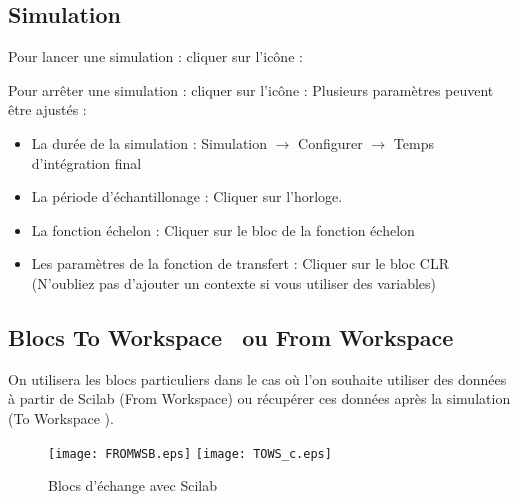 \subsection{Simulation}
Pour lancer une simulation : cliquer sur l'icône : 

Pour arrêter une simulation : cliquer sur l'icône : 
Plusieurs paramètres peuvent être ajustés :
\begin{itemize}
    \item La durée de la simulation : Simulation $\rightarrow$ 
          Configurer $\rightarrow$ Temps d'intégration final
    \item La période d'échantillonage : Cliquer sur l'horloge.
    \item La fonction échelon  : Cliquer sur le bloc de la fonction échelon
    \item Les paramètres de la fonction de transfert : Cliquer sur le bloc CLR 
          (N'oubliez pas d'ajouter un contexte si vous utiliser des variables)
\end{itemize}
\subsection{Blocs \og To Workspace \fg~ou \og From Workspace\fg}
On utilisera les blocs particuliers dans le cas où l'on souhaite 
utiliser des données à partir de Scilab (\og From Workspace\fg) 
ou récupérer ces données après la simulation (\og To Workspace \fg).
\begin{figure}[!h]
    \centering
    \texttt{[image: FROMWSB.eps]}\hspace{3cm}
    \texttt{[image: TOWS\_c.eps]}
    \caption{Blocs d'échange avec Scilab\label{fig-workspace}}
\end{figure}
\newpage

